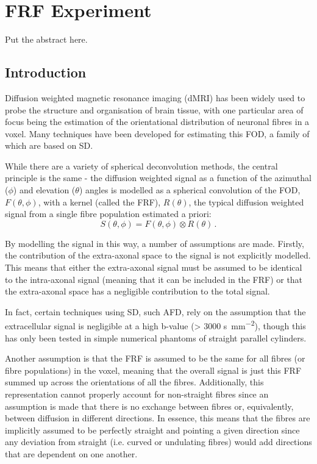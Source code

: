 \chapter{FRF Experiment}
\label{chap:frf_experiment}

\chaptertoc{}

\begin{chapterabstract}
Put the abstract here.
\end{chapterabstract}


\section{Introduction}
\label{sec:frf_introduction}
Diffusion weighted magnetic resonance imaging (dMRI) has been widely used to probe the structure and organisation of brain tissue, with one particular area of focus being the estimation of the orientational distribution of neuronal fibres in a voxel. Many techniques have been developed for estimating this \ac{FOD}, a family of which are based on \ac{SD}.

While there are a variety of spherical deconvolution methods, the central principle is the same - the diffusion weighted signal as a function of the azimuthal ($\phi$) and elevation ($\theta$) angles is modelled as a spherical convolution of the \ac{FOD}, $F(\theta,\phi)$, with a kernel (called the \ac{FRF}), $R(\theta)$, the typical diffusion weighted signal from a single fibre population estimated a priori:
\begin{equation}
  S(\theta, \phi) = F(\theta, \phi) \otimes R(\theta) \,.
  \label{eq:spherical_conv}
\end{equation}

By modelling the signal in this way, a number of assumptions are made. Firstly, the contribution of the extra-axonal space to the signal is not explicitly modelled. This means that either the extra-axonal signal must be assumed to be identical to the intra-axonal signal (meaning that it can be included in the \ac{FRF}) or that the extra-axonal space has a negligible contribution to the total signal.

In fact, certain techniques using \ac{SD}, such \ac{AFD}, rely on the assumption that the extracellular signal is negligible at a high b-value (> 3000 \si{\second\per\milli\metre\squared}), though this has only been tested in simple numerical phantoms of straight parallel cylinders. 

Another assumption is that the \ac{FRF} is assumed to be the same for all fibres (or fibre populations) in the voxel, meaning that the overall signal is just this \ac{FRF} summed up across the orientations of all the fibres.
Additionally, this representation cannot properly account for non-straight fibres since an assumption is made that there is no exchange between fibres or, equivalently, between diffusion in different directions.
In essence, this means that the fibres are implicitly assumed to be perfectly straight and pointing a given direction since any deviation from straight (i.e. curved or undulating fibres) would add directions that are dependent on one another.

